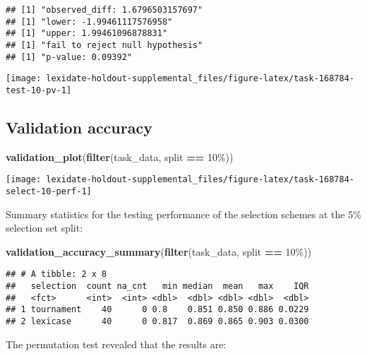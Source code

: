 \documentclass[
]{book}
\newenvironment{Shaded}{\begin{snugshade}}{\end{snugshade}}
\newcommand{\FunctionTok}[1]{\textcolor[rgb]{0.13,0.29,0.53}{\textbf{#1}}}
\newcommand{\NormalTok}[1]{#1}
\newcommand{\SpecialCharTok}[1]{\textcolor[rgb]{0.81,0.36,0.00}{\textbf{#1}}}
\newcommand{\StringTok}[1]{\textcolor[rgb]{0.31,0.60,0.02}{#1}}
\begin{document}
\begin{verbatim}
## [1] "observed_diff: 1.6796503157697"
## [1] "lower: -1.99461117576958"
## [1] "upper: 1.99461096878831"
## [1] "fail to reject null hypothesis"
## [1] "p-value: 0.09392"
\end{verbatim}

\texttt{[image: lexidate-holdout-supplemental\_files/figure-latex/task-168784-test-10-pv-1]}

\hypertarget{validation-accuracy-51}{%
\subsection{Validation accuracy}\label{validation-accuracy-51}}

\begin{Shaded}
\begin{Highlighting}[]
\FunctionTok{validation\_plot}\NormalTok{(}\FunctionTok{filter}\NormalTok{(task\_data, split }\SpecialCharTok{==} \StringTok{\textquotesingle{}10\%\textquotesingle{}}\NormalTok{))}
\end{Highlighting}
\end{Shaded}

\texttt{[image: lexidate-holdout-supplemental\_files/figure-latex/task-168784-select-10-perf-1]}

Summary statistics for the testing performance of the selection schemes at the 5\% selection set split:

\begin{Shaded}
\begin{Highlighting}[]
\FunctionTok{validation\_accuracy\_summary}\NormalTok{(}\FunctionTok{filter}\NormalTok{(task\_data, split }\SpecialCharTok{==} \StringTok{\textquotesingle{}10\%\textquotesingle{}}\NormalTok{))}
\end{Highlighting}
\end{Shaded}

\begin{verbatim}
## # A tibble: 2 x 8
##   selection  count na_cnt   min median  mean   max    IQR
##   <fct>      <int>  <int> <dbl>  <dbl> <dbl> <dbl>  <dbl>
## 1 tournament    40      0 0.8    0.851 0.850 0.886 0.0229
## 2 lexicase      40      0 0.817  0.869 0.865 0.903 0.0300
\end{verbatim}

The permutation test revealed that the results are:
\end{document}
